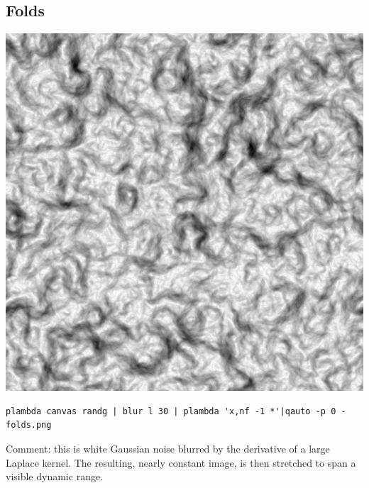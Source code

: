 \subsection{Folds}
\includegraphics{folds.png}
\begin{verbatim}
plambda canvas randg | blur l 30 | plambda 'x,nf -1 *'|qauto -p 0 - folds.png
\end{verbatim}
Comment: this is white Gaussian noise blurred by the derivative of a large
Laplace kernel.  The resulting, nearly constant image, is then stretched to
span a visible dynamic range.

